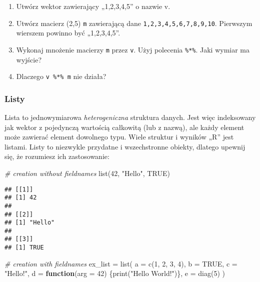\documentclass[
]{article}
\newenvironment{Shaded}{\begin{snugshade}}{\end{snugshade}}
\newcommand{\AttributeTok}[1]{\textcolor[rgb]{0.77,0.63,0.00}{#1}}
\newcommand{\CommentTok}[1]{\textcolor[rgb]{0.56,0.35,0.01}{\textit{#1}}}
\newcommand{\ConstantTok}[1]{\textcolor[rgb]{0.00,0.00,0.00}{#1}}
\newcommand{\ControlFlowTok}[1]{\textcolor[rgb]{0.13,0.29,0.53}{\textbf{#1}}}
\newcommand{\DecValTok}[1]{\textcolor[rgb]{0.00,0.00,0.81}{#1}}
\newcommand{\FunctionTok}[1]{\textcolor[rgb]{0.00,0.00,0.00}{#1}}
\newcommand{\NormalTok}[1]{#1}
\newcommand{\OtherTok}[1]{\textcolor[rgb]{0.56,0.35,0.01}{#1}}
\newcommand{\StringTok}[1]{\textcolor[rgb]{0.31,0.60,0.02}{#1}}
\providecommand{\tightlist}{%
  \setlength{\itemsep}{0pt}\setlength{\parskip}{0pt}}
\begin{document}
\begin{enumerate}
\def\labelenumi{\arabic{enumi}.}
\tightlist
\item
  Utwórz wektor zawierający „1,2,3,4,5'' o nazwie v.
\item
  Utwórz macierz (2,5) \texttt{m} zawierającą dane
  \texttt{1,2,3,4,5,6,7,8,9,10}. Pierwszym wierszem powinno być
  „1,2,3,4,5''.
\item
  Wykonaj mnożenie macierzy \texttt{m} przez \texttt{v}. Użyj polecenia
  \texttt{\%*\%}. Jaki wymiar ma wyjście?
\item
  Dlaczego \texttt{v\ \%*\%\ m} nie działa?
\end{enumerate}

\hypertarget{listy}{%
\subsubsection{Listy}\label{listy}}

Lista to jednowymiarowa \emph{heterogeniczna} struktura danych. Jest
więc indeksowany jak wektor z pojedynczą wartością całkowitą (lub z
nazwą), ale każdy element może zawierać element dowolnego typu. Wiele
struktur i wyników „R'' jest listami. Listy to niezwykle przydatne i
wszechstronne obiekty, dlatego upewnij się, że rozumiesz ich
zastosowanie:

\begin{Shaded}
\begin{Highlighting}[]
\CommentTok{\# creation without fieldnames}
\FunctionTok{list}\NormalTok{(}\DecValTok{42}\NormalTok{, }\StringTok{"Hello"}\NormalTok{, }\ConstantTok{TRUE}\NormalTok{)}
\end{Highlighting}
\end{Shaded}

\begin{verbatim}
## [[1]]
## [1] 42
## 
## [[2]]
## [1] "Hello"
## 
## [[3]]
## [1] TRUE
\end{verbatim}

\begin{Shaded}
\begin{Highlighting}[]
\CommentTok{\# creation with fieldnames}
\NormalTok{ex\_list }\OtherTok{=} \FunctionTok{list}\NormalTok{(}
  \AttributeTok{a =} \FunctionTok{c}\NormalTok{(}\DecValTok{1}\NormalTok{, }\DecValTok{2}\NormalTok{, }\DecValTok{3}\NormalTok{, }\DecValTok{4}\NormalTok{),}
  \AttributeTok{b =} \ConstantTok{TRUE}\NormalTok{,}
  \AttributeTok{c =} \StringTok{"Hello!"}\NormalTok{,}
  \AttributeTok{d =} \ControlFlowTok{function}\NormalTok{(}\AttributeTok{arg =} \DecValTok{42}\NormalTok{) \{}\FunctionTok{print}\NormalTok{(}\StringTok{"Hello World!"}\NormalTok{)\},}
  \AttributeTok{e =} \FunctionTok{diag}\NormalTok{(}\DecValTok{5}\NormalTok{)}
\NormalTok{)}
\end{Highlighting}
\end{Shaded}
\end{document}
